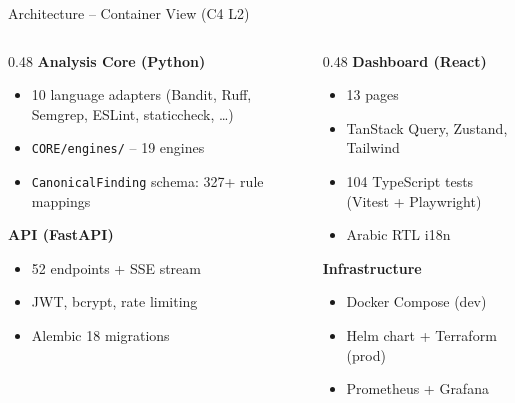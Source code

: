 \documentclass[aspectratio=169,12pt]{beamer}
\begin{document}
\begin{frame}{Architecture -- Container View (C4 L2)}
  \begin{columns}[T]
    \begin{column}{0.48\textwidth}
      \textbf{Analysis Core (Python)}
      \begin{itemize}\small
        \item 10 language adapters (Bandit, Ruff, Semgrep, ESLint, staticcheck, \ldots)
        \item \texttt{CORE/engines/} -- 19 engines
        \item \texttt{CanonicalFinding} schema: 327+ rule mappings
      \end{itemize}
      \vspace{4pt}
      \textbf{API (FastAPI)}
      \begin{itemize}\small
        \item 52 endpoints + SSE stream
        \item JWT, bcrypt, rate limiting
        \item Alembic 18 migrations
      \end{itemize}
    \end{column}
    \begin{column}{0.48\textwidth}
      \textbf{Dashboard (React)}
      \begin{itemize}\small
        \item 13 pages
        \item TanStack Query, Zustand, Tailwind
        \item 104 TypeScript tests (Vitest + Playwright)
        \item Arabic RTL i18n
      \end{itemize}
      \vspace{4pt}
      \textbf{Infrastructure}
      \begin{itemize}\small
        \item Docker Compose (dev)
        \item Helm chart + Terraform (prod)
        \item Prometheus + Grafana
      \end{itemize}
    \end{column}
  \end{columns}
\end{frame}
\end{document}
